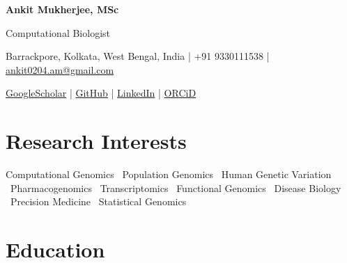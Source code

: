 \documentclass[10pt,a4paper]{article}
\begin{document}

\begin{center}

{\fontsize{24}{28} \selectfont \bfseries Ankit Mukherjee, MSc}

\vspace{0.3em}

{\normalsize Computational Biologist}

\vspace{0.45em}

Barrackpore, Kolkata, West Bengal, India
\quad | \quad
+91 9330111538
\quad | \quad
\href{mailto:ankit0204.am@gmail.com}{ankit0204.am@gmail.com}

\vspace{0.2em}

\href{https://scholar.google.com/citations?user=2D5kUnQAAAAJ&hl=en}{GoogleScholar}
\quad | \quad
\href{https://github.com/AnkitMukherji}{GitHub}
\quad | \quad
\href{https://www.linkedin.com/in/ankit-mukherjee-647ab81ba/}{LinkedIn}
\quad | \quad
\href{https://orcid.org/0009-0005-5847-5986}{ORCiD}

\end{center}

\vspace{0.4em}


\section{Research Interests}

Computational Genomics \textbullet\ Population Genomics \textbullet\ Human Genetic Variation
\textbullet\ Pharmacogenomics \textbullet\ Transcriptomics \textbullet\ Functional Genomics
\textbullet\ Disease Biology \textbullet\ Precision Medicine \textbullet\ Statistical Genomics


\section{Education}
\end{document}

